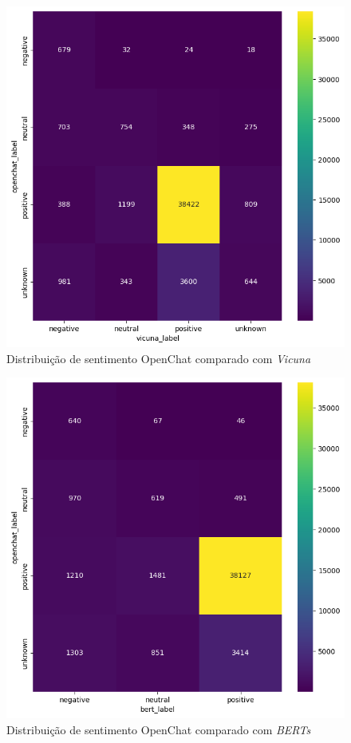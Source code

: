 \begin{figure}
	\centering
	\includegraphics[width=.8\textwidth]{figs/openchat/heat_vs_vicuna.png}
	\caption{Distribuição de sentimento OpenChat comparado com \textit{Vicuna}}
	\label{img:heat_openchat_vs_vicuna}
\end{figure}

\begin{figure}
	\centering
	\includegraphics[width=.8\textwidth]{figs/openchat/heat_vs_bert.png}
	\caption{Distribuição de sentimento OpenChat comparado com \textit{BERTs}}
	\label{img:heat_openchat_vs_bert}
\end{figure}

